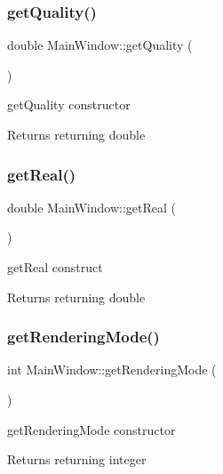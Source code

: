 \subsubsection{\texorpdfstring{get\+Quality()}{getQuality()}}
{\footnotesize\ttfamily double Main\+Window\+::get\+Quality (\begin{DoxyParamCaption}{ }\end{DoxyParamCaption})}



get\+Quality constructor 

\begin{DoxyReturn}{Returns}
returning double 
\end{DoxyReturn}
\mbox{\label{classMainWindow_ac2e149fa1e1eacf3166c3fb6943a6623}} 
\subsubsection{\texorpdfstring{get\+Real()}{getReal()}}
{\footnotesize\ttfamily double Main\+Window\+::get\+Real (\begin{DoxyParamCaption}{ }\end{DoxyParamCaption})}



get\+Real construct 

\begin{DoxyReturn}{Returns}
returning double 
\end{DoxyReturn}
\mbox{\label{classMainWindow_adfbd73af7cca6690ea0dc032d08770f2}} 
\subsubsection{\texorpdfstring{get\+Rendering\+Mode()}{getRenderingMode()}}
{\footnotesize\ttfamily int Main\+Window\+::get\+Rendering\+Mode (\begin{DoxyParamCaption}{ }\end{DoxyParamCaption})}



get\+Rendering\+Mode constructor 

\begin{DoxyReturn}{Returns}
returning integer 
\end{DoxyReturn}
\mbox{\label{classMainWindow_a7ee8a672f617c1eaa5a83b6db735e51b}} 
